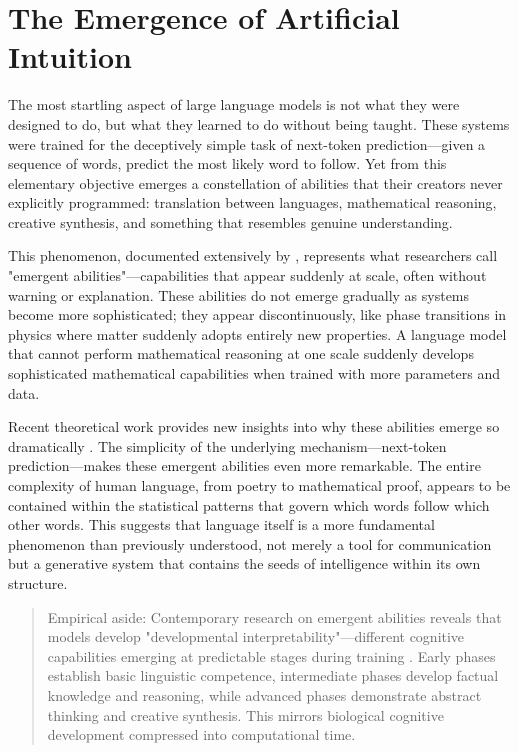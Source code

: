 \section{The Emergence of Artificial Intuition}

The most startling aspect of large language models is not what they were designed to do, but what they learned to do without being taught. These systems were trained for the deceptively simple task of next-token prediction—given a sequence of words, predict the most likely word to follow. Yet from this elementary objective emerges a constellation of abilities that their creators never explicitly programmed: translation between languages, mathematical reasoning, creative synthesis, and something that resembles genuine understanding.

This phenomenon, documented extensively by \textcite{wei2022emergent}, represents what researchers call "emergent abilities"—capabilities that appear suddenly at scale, often without warning or explanation. These abilities do not emerge gradually as systems become more sophisticated; they appear discontinuously, like phase transitions in physics where matter suddenly adopts entirely new properties. A language model that cannot perform mathematical reasoning at one scale suddenly develops sophisticated mathematical capabilities when trained with more parameters and data.

Recent theoretical work provides new insights into why these abilities emerge so dramatically \parencite{havlik2025why}. The simplicity of the underlying mechanism—next-token prediction—makes these emergent abilities even more remarkable. The entire complexity of human language, from poetry to mathematical proof, appears to be contained within the statistical patterns that govern which words follow which other words. This suggests that language itself is a more fundamental phenomenon than previously understood, not merely a tool for communication but a generative system that contains the seeds of intelligence within its own structure.

\begin{quote}\small
Empirical aside: Contemporary research on emergent abilities reveals that models develop "developmental interpretability"—different cognitive capabilities emerging at predictable stages during training \parencite{kendiukhov2025review}. Early phases establish basic linguistic competence, intermediate phases develop factual knowledge and reasoning, while advanced phases demonstrate abstract thinking and creative synthesis. This mirrors biological cognitive development compressed into computational time.
\end{quote}

